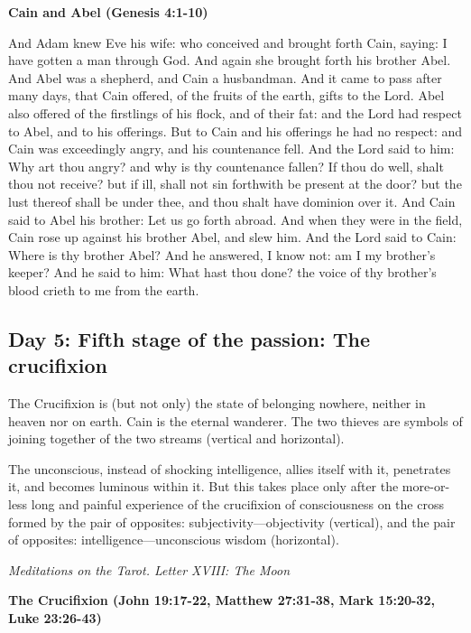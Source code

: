 \textbf{Cain and Abel (Genesis 4:1-10)}

And Adam knew Eve his wife: who conceived and brought forth Cain, saying: I have gotten a man through God. And again she
brought forth his brother Abel. And Abel was a shepherd, and Cain a husbandman. And it came to pass after many days,
that Cain offered, of the fruits of the earth, gifts to the Lord. Abel also offered of the firstlings of his flock, and
of their fat: and the Lord had respect to Abel, and to his offerings. But to Cain and his offerings he had no respect:
and Cain was exceedingly angry, and his countenance fell. And the Lord said to him: Why art thou angry? and why is thy
countenance fallen? If thou do well, shalt thou not receive? but if ill, shall not sin forthwith be present at the
door? but the lust thereof shall be under thee, and thou shalt have dominion over it. And Cain said to Abel his
brother: Let us go forth abroad. And when they were in the field, Cain rose up against his brother Abel, and slew him.
And the Lord said to Cain: Where is thy brother Abel? And he answered, I know not: am I my
brother's keeper? And he said to him: What hast thou done? the voice of thy
brother's blood crieth to me from the earth.

\subsection*{Day 5: Fifth stage of the passion: The crucifixion}
The Crucifixion is (but not only) the state of belonging nowhere, neither in heaven nor on earth. Cain is the eternal
wanderer. The two thieves are symbols of joining together of the two streams (vertical and horizontal).

\begin{quotationx}
The unconscious, instead of shocking intelligence, allies itself with it, penetrates it, and becomes luminous within it.
But this takes place only after the more-or-less long and painful experience of the crucifixion of consciousness on the
cross formed by the pair of opposites: subjectivity—objectivity (vertical), and the pair of
opposites: intelligence—unconscious wisdom (horizontal). \begin{flushright} \textit{Meditations on the Tarot. Letter XVIII: The Moon}\end{flushright} 

\end{quotationx}

\textbf{The Crucifixion (John 19:17-22, Matthew 27:31-38, Mark 15:20-32, Luke 23:26-43)}

